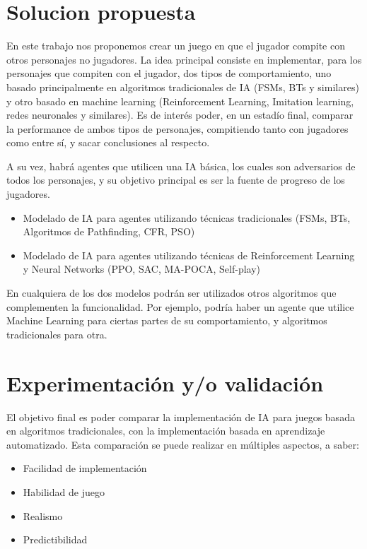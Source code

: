\documentclass[a4paper]{article}
\begin{document}
\section{Solucion propuesta}

En este trabajo nos proponemos crear un juego en que el jugador compite con otros personajes no jugadores. La idea principal consiste en implementar, para los personajes que compiten con el jugador, dos tipos de comportamiento, uno basado principalmente en algoritmos tradicionales de IA (FSMs, BTs y similares) y otro basado en machine learning (Reinforcement Learning, Imitation learning, redes neuronales y similares). Es de interés poder, en un estadío final, comparar la performance de ambos tipos de personajes, compitiendo tanto con jugadores como entre sí, y sacar conclusiones al respecto.

A su vez, habrá agentes que utilicen una IA básica, los cuales son adversarios de todos los personajes, y su objetivo principal es ser la fuente de progreso de los jugadores.

\begin{itemize}
    \item Modelado de IA para agentes utilizando técnicas tradicionales (FSMs, BTs, Algoritmos de Pathfinding, CFR, PSO)
    \item Modelado de IA para agentes utilizando técnicas de Reinforcement Learning y Neural Networks (PPO, SAC, MA-POCA, Self-play)
\end{itemize}

En cualquiera de los dos modelos podrán ser utilizados otros algoritmos que complementen la funcionalidad. Por ejemplo, podría haber un agente que utilice Machine Learning para ciertas partes de su comportamiento, y algoritmos tradicionales para otra.

\section{Experimentación y/o validación}

El objetivo final es poder comparar la implementación de IA para juegos basada en algoritmos tradicionales, con la implementación basada en aprendizaje automatizado. Esta comparación se puede realizar en múltiples aspectos, a saber:

\begin{itemize}
    \item Facilidad de implementación
    \item Habilidad de juego
    \item Realismo
    \item Predictibilidad
\end{itemize}
\end{document}
